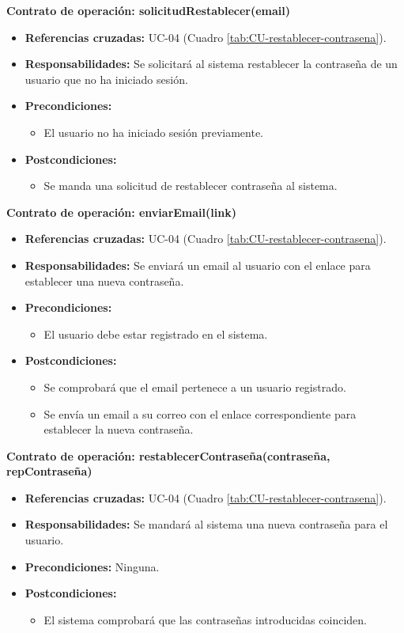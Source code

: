 \textbf{Contrato de operación: solicitudRestablecer(email)}
\begin{itemize}
\item \textbf{Referencias cruzadas:} UC-04 (Cuadro \ref{tab:CU-restablecer-contrasena}).
\item \textbf{Responsabilidades:} Se solicitará al sistema restablecer la contraseña de un usuario que no ha iniciado sesión.
\item \textbf{Precondiciones:} 
 \begin{itemize}
\item El usuario no ha iniciado sesión previamente.
\end {itemize}
\item \textbf{Postcondiciones:} 
 \begin{itemize}
\item Se manda una solicitud de restablecer contraseña al sistema.
\end {itemize}
\end {itemize}

\textbf{Contrato de operación: enviarEmail(link)}
\begin{itemize}
\item \textbf{Referencias cruzadas:} UC-04 (Cuadro \ref{tab:CU-restablecer-contrasena}).
\item \textbf{Responsabilidades:} Se enviará un email al usuario con el enlace para establecer una nueva contraseña.
\item \textbf{Precondiciones:} 
 \begin{itemize}
\item El usuario debe estar registrado en el sistema.
\end {itemize}
\item \textbf{Postcondiciones:} 
 \begin{itemize}
\item Se comprobará que el email pertenece a un usuario registrado.
\item Se envía un email a su correo con el enlace correspondiente para establecer la nueva contraseña.
\end {itemize}
\end {itemize}

\textbf{Contrato de operación: restablecerContraseña(contraseña, repContraseña)}
\begin{itemize}
\item \textbf{Referencias cruzadas:} UC-04 (Cuadro \ref{tab:CU-restablecer-contrasena}).
\item \textbf{Responsabilidades:} Se mandará al sistema una nueva contraseña para el usuario.
\item \textbf{Precondiciones:} Ninguna.
\item \textbf{Postcondiciones:} 
 \begin{itemize}
\item El sistema comprobará que las contraseñas introducidas coinciden.
\end {itemize}
\end {itemize}

